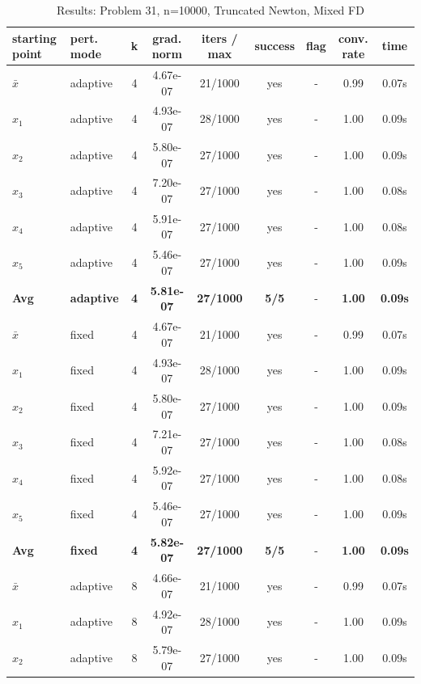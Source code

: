 \begin{longtable}{|l|l|c|c|c|c|c|c|c|}
\caption{Results: Problem 31, n=10000, Truncated Newton, Mixed FD} \\
\hline
\textbf{starting point} & \textbf{pert. mode} & \textbf{k} & \textbf{grad. norm} & \textbf{iters / max} & \textbf{success} & \textbf{flag} & \textbf{conv. rate} & \textbf{time} \\
\hline
\endfirsthead
\endhead
\endfoot
\hline
\endlastfoot
$\bar{x}$ & adaptive & 4 & 4.67e-07 & 21/1000 & yes & - & 0.99 & 0.07s \\
\hline
$x_1$ & adaptive & 4 & 4.93e-07 & 28/1000 & yes & - & 1.00 & 0.09s \\
\hline
$x_2$ & adaptive & 4 & 5.80e-07 & 27/1000 & yes & - & 1.00 & 0.09s \\
\hline
$x_3$ & adaptive & 4 & 7.20e-07 & 27/1000 & yes & - & 1.00 & 0.08s \\
\hline
$x_4$ & adaptive & 4 & 5.91e-07 & 27/1000 & yes & - & 1.00 & 0.08s \\
\hline
$x_5$ & adaptive & 4 & 5.46e-07 & 27/1000 & yes & - & 1.00 & 0.09s \\
\hline
\hline\hline
\textbf{Avg} & \textbf{adaptive} & \textbf{4} & \textbf{5.81e-07} & \textbf{27/1000} & \textbf{5/5} & - & \textbf{1.00} & \textbf{0.09s} \\
\hline\hline
\hline
$\bar{x}$ & fixed & 4 & 4.67e-07 & 21/1000 & yes & - & 0.99 & 0.07s \\
\hline
$x_1$ & fixed & 4 & 4.93e-07 & 28/1000 & yes & - & 1.00 & 0.09s \\
\hline
$x_2$ & fixed & 4 & 5.80e-07 & 27/1000 & yes & - & 1.00 & 0.09s \\
\hline
$x_3$ & fixed & 4 & 7.21e-07 & 27/1000 & yes & - & 1.00 & 0.08s \\
\hline
$x_4$ & fixed & 4 & 5.92e-07 & 27/1000 & yes & - & 1.00 & 0.08s \\
\hline
$x_5$ & fixed & 4 & 5.46e-07 & 27/1000 & yes & - & 1.00 & 0.09s \\
\hline
\hline\hline
\textbf{Avg} & \textbf{fixed} & \textbf{4} & \textbf{5.82e-07} & \textbf{27/1000} & \textbf{5/5} & - & \textbf{1.00} & \textbf{0.09s} \\
\hline\hline
$\bar{x}$ & adaptive & 8 & 4.66e-07 & 21/1000 & yes & - & 0.99 & 0.07s \\
\hline
$x_1$ & adaptive & 8 & 4.92e-07 & 28/1000 & yes & - & 1.00 & 0.09s \\
\hline
$x_2$ & adaptive & 8 & 5.79e-07 & 27/1000 & yes & - & 1.00 & 0.09s \\

\end{longtable}
